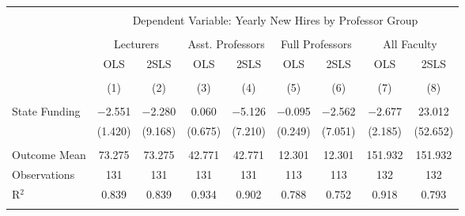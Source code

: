 
\begin{tabular}{@{\extracolsep{5pt}}lcccccccc} 
\\[-1.8ex]\hline 
\hline \\[-1.8ex] 
 & \multicolumn{8}{c}{Dependent Variable: Yearly New Hires by Professor Group} \\ 
\cline{2-9} 
\\[-1.8ex] & \multicolumn{2}{c}{Lecturers} & \multicolumn{2}{c}{Asst. Professors} & \multicolumn{2}{c}{Full Professors} & \multicolumn{2}{c}{All Faculty} \\ 
 & OLS & 2SLS & OLS & 2SLS & OLS & 2SLS & OLS & 2SLS \\ 
\\[-1.8ex] & (1) & (2) & (3) & (4) & (5) & (6) & (7) & (8)\\ 
\hline \\[-1.8ex] 
 State Funding & $-$2.551 & $-$2.280 & 0.060 & $-$5.126 & $-$0.095 & $-$2.562 & $-$2.677 & 23.012 \\ 
  & (1.420) & (9.168) & (0.675) & (7.210) & (0.249) & (7.051) & (2.185) & (52.652) \\ 
 \hline \\[-1.8ex] 
Outcome Mean & 73.275 & 73.275 & 42.771 & 42.771 & 12.301 & 12.301 & 151.932 & 151.932 \\ 
Observations & 131 & 131 & 131 & 131 & 113 & 113 & 132 & 132 \\ 
R$^{2}$ & 0.839 & 0.839 & 0.934 & 0.902 & 0.788 & 0.752 & 0.918 & 0.793 \\ 
\hline 
\hline \\[-1.8ex] 
\end{tabular} 
